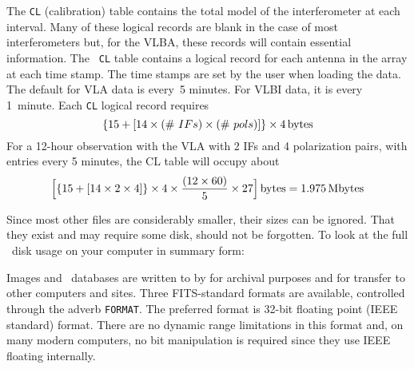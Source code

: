      The {\tt CL} (calibration) table contains the total model of the
interferometer at each interval.  Many of these
logical records are blank in the case of most interferometers but, for
the VLBA, these records will contain essential information.  The {\tt
CL} table contains a logical record for each antenna in the array at
each  time stamp. The  time stamps are set by the
user when loading the data.  The default for VLA data is every~5
minutes.  For VLBI data, it is every 1~minute.  Each {\tt CL} logical
record requires
$$
  \lbrace 15 + \lbrack 14 \times  (\#~IFs) \times
       (\#~pols)\rbrack\rbrace \times 4 \rm\, bytes
$$
For a 12-hour observation with the VLA with 2 IFs and 4 polarization
pairs, with entries every 5 minutes, the CL table will occupy about
$$
   \Bigl\lbrack\lbrace 15 + \lbrack 14 \times 2 \times 4 \rbrack\rbrace
   \times 4 \times {(12 \times 60) \over 5 } \times 27 \Bigr\rbrack
   \rm\, bytes
   = 1.975 \rm\, Mbytes
$$

     Since most other files are considerably smaller, their sizes can
be ignored.  That they exist and may require some disk, should not be
forgotten.  To look at the full \AIPS\ disk usage on your computer in
summary form:
\pd


     Images and \uv\ databases are written to  by
{\tt {}} for archival purposes and for transfer to other
computers and sites.  Three FITS-standard formats are available,
controlled through the adverb {\tt FORMAT}.  The preferred format is
32-bit floating point (IEEE standard) format.  There are no dynamic
range limitations in this format and, on many modern computers, no bit
manipulation is required since they use IEEE floating internally.

